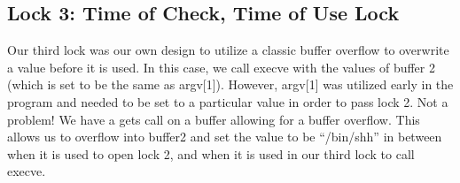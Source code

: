 \subsection{Lock 3: Time of Check, Time of Use Lock}
Our third lock was our own design to utilize a classic buffer overflow to overwrite a value before it is used. In this case, we call execve with the values of buffer 2 (which is set to be the same as argv[1]). However, argv[1] was utilized early in the program and needed to be set to a particular value in order to pass lock 2. Not a problem! We have a gets call on a buffer allowing for a buffer overflow. This allows us to overflow into buffer2 and set the value to be ``/bin/shh'' in between when it is used to open lock 2, and when it is used in our third lock to call execve. 
